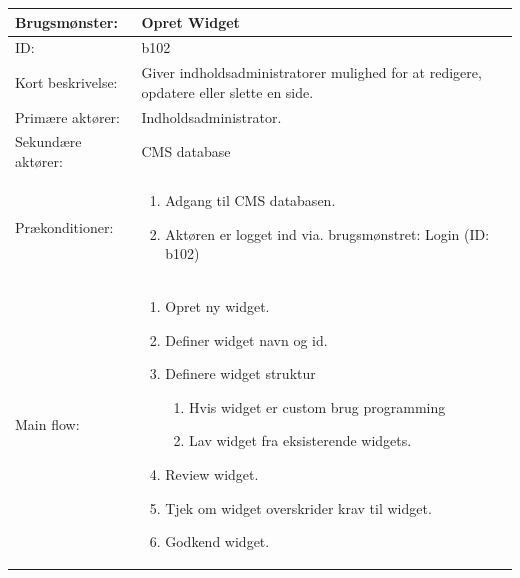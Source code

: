 \begin{table}[t]
\centering
    \begin{tabular}{|p{5cm}|p{10cm}|}
        \hline
        Brugsmønster: & Opret Widget \\ 

        \hline
        ID: & b102 \\ 

        \hline
        Kort beskrivelse: & Giver indholdsadministratorer mulighed for at redigere, opdatere eller slette en side. \\ 
        \hline
        Primære aktører: & Indholdsadministrator. \\ 
        \hline
        Sekundære aktører: & CMS database \\ 
        \hline
        Prækonditioner: & 
        \begin{minipage}{10cm}
        	\begin{enumerate}
        	\item Adgang til CMS databasen.
            \item Aktøren er logget ind via. brugsmønstret: Login (ID: b102) 
        	\end{enumerate}
        \end{minipage} \par \\ 
        \hline
        Main flow: &  
        \begin{minipage}{10cm}
        	\begin{enumerate}
        	\item Opret ny widget.
            \item Definer widget navn og id.
            \item Definere widget struktur
              \begin{enumerate}
                \item Hvis widget er custom brug programming
                \item Lav widget fra eksisterende widgets.
              \end{enumerate}
            \item Review widget.
            \item Tjek om widget overskrider krav til widget.
            \item Godkend widget.
        	\end{enumerate}
        \end{minipage} \par \\ 

\end{tabular}
\end{table}

